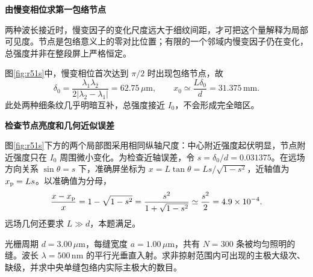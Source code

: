 \begin{solution}
\par\medskip{}\noindent\textbf{由慢变相位求第一包络节点}\par\nobreak
两种波长接近时，慢变因子的变化尺度远大于细纹间距，才可把这个量解释为局部可见度。节点是包络意义上的零对比位置；有限的一个邻域内慢变因子仍在变化，总强度并非在整段屏上严格恒定。

图\ref{fig:r51s}中，慢变相位首次达到 \(\pi/2\) 时出现包络节点，故
\[
 \boxed{\delta_0=\frac{\lambda_1\lambda_2}{2|\lambda_2-\lambda_1|}
 =62.75\,\mu\mathrm m},\qquad
 \boxed{x_0\simeq\frac{L\delta_0}{d}=31.375\,\mathrm{mm}}.
\]
此处两种细条纹几乎明暗互补，总强度接近 \(I_0\)，不会形成完全暗区。



\par\medskip{}\noindent\textbf{检查节点亮度和几何近似误差}\par\nobreak
图\ref{fig:r51s}下方的两个局部图采用相同纵轴尺度：中心附近强度起伏明显，节点附近强度只在 \(I_0\) 周围微小变化。为检查近轴误差，令 $s=\delta_0/d=0.031375$。在远场方向关系 $\sin\theta=s$ 下，准确屏坐标为 $x=L\tan\theta=Ls/\sqrt{1-s^2}$，近轴值为 $x_{\rm p}=Ls$。以准确值为分母，
\[
 \frac{x-x_{\rm p}}x=1-\sqrt{1-s^2}
 =\frac{s^2}{1+\sqrt{1-s^2}}\simeq\frac{s^2}{2}=4.9\times10^{-4}.
\]
远场几何还要求 \(L\gg d\)，本题满足。
\end{solution}

\begin{question}
\begin{example}[有限缝宽造成的光栅缺级]\label{ex:r52}
光栅周期 \(d=3.00\,\mu\mathrm m\)，每缝宽度 \(a=1.00\,\mu\mathrm m\)，共有 \(N=300\) 条被均匀照明的缝。波长 \(\lambda=500\,\mathrm{nm}\) 的平行光垂直入射。求非掠射范围内可出现的主极大级次、缺级，并求中央单缝包络内实际主极大的数目。
\end{example}
\end{question}

